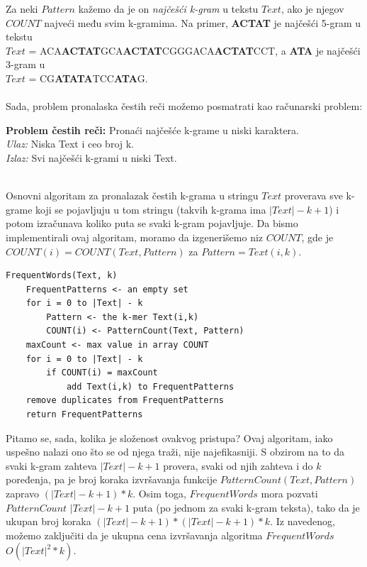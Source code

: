 Za neki $Pattern$ kažemo da je on \textit{najčešći k-gram} u tekstu $Text$, ako je njegov $COUNT$ najveći među svim k-gramima. Na primer, \textbf{ACTAT} je najčešći 5-gram u tekstu 
\\
$Text$ = ACA\textbf{ACTAT}GCA\textbf{ACTAT}CGGGACA\textbf{ACTAT}CCT,
a \textbf{ATA} je najčešći 3-gram u \\ $Text$ = CG\textbf{ATATA}TCC\textbf{ATA}G.\\\\
Sada, problem pronalaska čestih reči možemo posmatrati kao računarski problem:\\
\begin{tcolorbox}
\textbf{Problem čestih reči:} Pronaći najčešće k-grame u niski karaktera.\\
\textit{Ulaz:} Niska Text i ceo broj k.\\
\textit{Izlaz:} Svi najčešći k-grami u niski Text.
\end{tcolorbox}
~\\
Osnovni algoritam za pronalazak čestih k-grama u stringu $Text$ proverava sve k-grame koji se pojavljuju u tom stringu (takvih k-grama ima $|Text|-k+1$) i potom izračunava koliko puta se svaki k-gram pojavljuje. Da bismo implementirali ovaj algoritam, moramo da izgenerišemo niz $COUNT$, gde je $COUNT(i) = COUNT(Text, Pattern)$ za $Pattern = Text(i,k)$.\\

\begin{lstlisting}
FrequentWords(Text, k)
	FrequentPatterns <- an empty set
	for i = 0 to |Text| - k
		Pattern <- the k-mer Text(i,k)
		COUNT(i) <- PatternCount(Text, Pattern)
	maxCount <- max value in array COUNT
	for i = 0 to |Text| - k
		if COUNT(i) = maxCount
			add Text(i,k) to FrequentPatterns
	remove duplicates from FrequentPatterns
	return FrequentPatterns
\end{lstlisting}

\noindent Pitamo se, sada, kolika je složenost ovakvog pristupa? Ovaj algoritam, iako uspešno nalazi ono što se od njega traži, nije najefikasniji. S obzirom na to da svaki k-gram zahteva $|Text|-k+1$ provera, svaki od njih zahteva i do $k$ poređenja, pa je broj koraka izvršavanja funkcije $PatternCount(Text, Pattern)$ zapravo $(|Text|-k+1)*k$. Osim toga, $FrequentWords$ mora pozvati $PatternCount$ $|Text|-k+1$ puta (po jednom za svaki k-gram teksta), tako da je ukupan broj koraka \textit{$(|Text|-k+1)*(|Text|-k+1)*k$}. Iz navedenog, možemo zaključiti da je ukupna cena izvršavanja algoritma $FrequentWords$ \textbf{$O(|Text|^2*k)$}.

